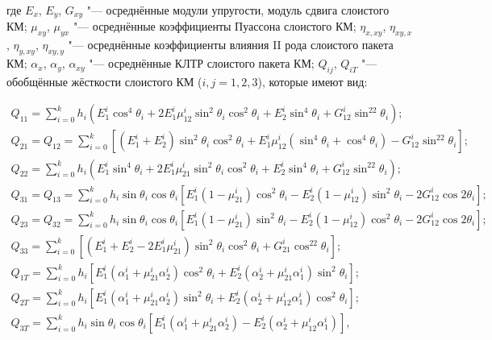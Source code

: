 где $E_x$, $E_y$, $G_{xy}$ "--- осреднённые модули упругости, модуль сдвига слоистого КМ; $\mu_{xy}$, $\mu_{yx}$ "--- осреднённые коэффициенты Пуассона слоистого КМ; $\eta_{x,xy}$, $\eta_{xy,x}$, $\eta_{y,xy}$, $\eta_{xy,y}$ "--- осреднённые коэффициенты влияния II рода слоистого пакета КМ; $\alpha_x$, $\alpha_y$, $\alpha_{xy}$ "--- осреднённые КЛТР слоистого пакета КМ; $Q_{ij}$, $Q_{iT}$ "--- обобщённые жёсткости слоистого КМ ($i,j=1,2,3$), которые имеют вид:

\begin{gather*}

Q_{11}=\sum_{i=0}^{k}h_i(E_1^i\cos^4\theta_i+2E_1^i\mu_{12}^i\sin^2\theta_i\cos^2\theta_i+E_2^i\sin^4\theta_i+G_{12}^i\sin^22\theta_i);

\\

Q_{21}=Q_{12}=\sum_{i=0}^{k}[(E_1^i+E_2^i)\sin^2\theta_i\cos^2\theta_i+E_1^i\mu_{12}^i(\sin^4\theta_i+\cos^4\theta_i)-G_{12}^i\sin^22\theta_i];

\\

Q_{22}=\sum_{i=0}^{k}h_i(E_1^i\sin^4\theta_i+2E_1^i\mu_{21}^i\sin^2\theta_i\cos^2\theta_i+E_2^i\sin^4\theta_i+G_{12}^i\sin^22\theta_i);

\\

Q_{31}=Q_{13}=\sum_{i=0}^{k}h_i\sin\theta_i\cos\theta_i[E_1^i(1-\mu_{21}^i)\cos^2\theta_i-E_2^i(1-\mu_{12}^i)\sin^2\theta_i-2G_{12}^i\cos2\theta_i];

\\

Q_{23}=Q_{32}=\sum_{i=0}^{k}h_i\sin\theta_i\cos\theta_i[E_1^i(1-\mu_{21}^i)\sin^2\theta_i-E_2^i(1-\mu_{12}^i)\cos^2\theta_i-2G_{12}^i\cos2\theta_i];

\\

Q_{33}=\sum_{i=0}^{k}[(E_1^i+E_2^i-2E_1^i\mu_{21}^i)\sin^2\theta_i\cos^2\theta_i+G_{21}^i\cos^22\theta_i];

\\

Q_{1T}=\sum_{i=0}^{k}h_i[E_1^i(\alpha_1^i+\mu_{21}^i\alpha_2^i)\cos^2\theta_i+E_2^i(\alpha_2^i+\mu_{21}^i\alpha_1^i)\sin^2\theta_i];

\\

Q_{2T}=\sum_{i=0}^{k}h_i[E_1^i(\alpha_1^i+\mu_{21}^i\alpha_2^i)\sin^2\theta_i+E_2^i(\alpha_2^i+\mu_{12}^i\alpha_1^i)\cos^2\theta_i];

\\

Q_{3T}=\sum_{i=0}^{k}h_i\sin\theta_i\cos\theta_i[E_1^i(\alpha_1^i+\mu_{21}^i\alpha_2^i)-E_2^i(\alpha_2^i+\mu_{12}^i\alpha_1^i)],

\end{gather*}

